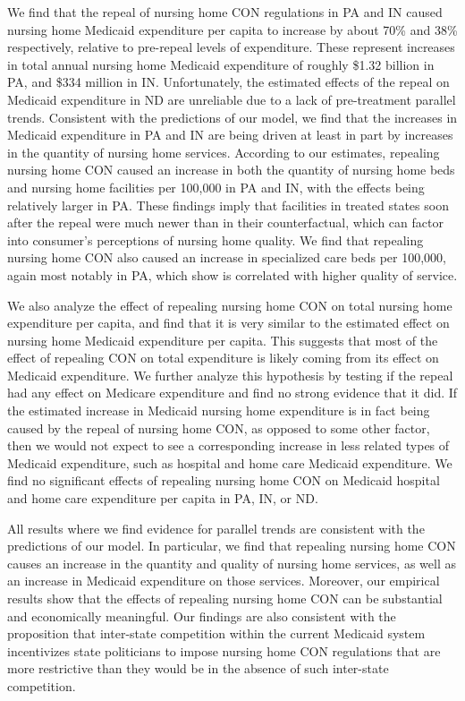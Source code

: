 \documentclass[../Main.tex]{subfiles}
\begin{document}
We find that the repeal of nursing home CON regulations in PA and IN caused nursing home Medicaid expenditure per capita to increase by about 70\% and 38\% respectively, relative to pre-repeal levels of expenditure. These represent increases in total annual nursing home Medicaid expenditure of roughly \$1.32 billion in PA, and \$334 million in IN. Unfortunately, the estimated effects of the repeal on Medicaid expenditure in ND are unreliable due to a lack of pre-treatment parallel trends. Consistent with the predictions of our model, we find that the increases in Medicaid expenditure in PA and IN are being driven at least in part by increases in the quantity of nursing home services. According to our estimates, repealing nursing home CON caused an increase in both the quantity of nursing home beds and nursing home facilities per 100,000 in PA and IN, with the effects being relatively larger in PA. These findings imply that facilities in treated states soon after the repeal were much newer than in their counterfactual, which can factor into consumer's perceptions of nursing home quality. We find that repealing nursing home CON also caused an increase in specialized care beds per 100,000, again most notably in PA, which \citet{grabowski2010quality} show is correlated with higher quality of service. 

We also analyze the effect of repealing nursing home CON on total nursing home expenditure per capita, and find that it is very similar to the estimated effect on nursing home Medicaid expenditure per capita. This suggests that most of the effect of repealing CON on total expenditure is likely coming from its effect on Medicaid expenditure. We further analyze this hypothesis by testing if the repeal had any effect on Medicare expenditure and find no strong evidence that it did. If the estimated increase in Medicaid nursing home expenditure is in fact being caused by the repeal of nursing home CON, as opposed to some other factor, then we would not expect to see a corresponding increase in less related types of Medicaid expenditure, such as hospital and home care Medicaid expenditure. We find no significant effects of repealing nursing home CON on Medicaid hospital and home care expenditure per capita in PA, IN, or ND. 

All results where we find evidence for parallel trends are consistent with the predictions of our model. In particular, we find that repealing nursing home CON causes an increase in the quantity and quality of nursing home services, as well as an increase in Medicaid expenditure on those services. Moreover, our empirical results show that the effects of repealing nursing home CON can be substantial and economically meaningful. Our findings are also consistent with the proposition that inter-state competition within the current Medicaid system incentivizes state politicians to impose nursing home CON regulations that are more restrictive than they would be in the absence of such inter-state competition.
\end{document}
